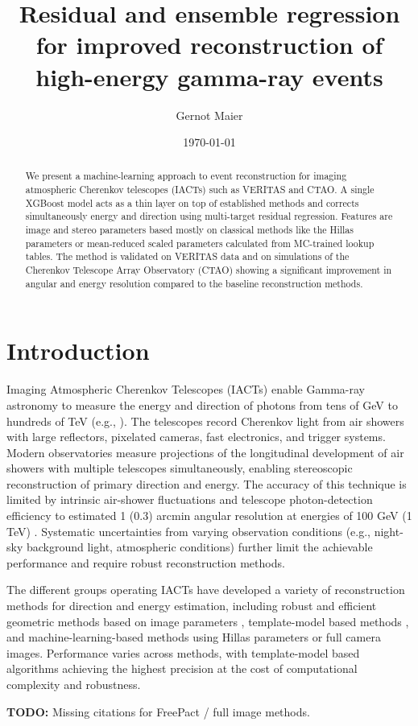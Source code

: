 \documentclass[12pt]{article}
\title{Residual and ensemble regression for improved reconstruction of high-energy gamma-ray events}
\author{Gernot Maier}
\date{\today}
\newcommand{\todo}[1]{\begin{hintBox} \textbf{TODO:} #1 \end{hintBox}}
\begin{document}
\maketitle

\begin{abstract}
We present a machine-learning approach to event reconstruction
for imaging atmospheric Cherenkov telescopes (IACTs) such as VERITAS and
CTAO.
A single XGBoost model acts as a thin layer on top of established methods and
corrects simultaneously energy and direction using multi-target residual regression.
Features are image and stereo parameters based mostly on classical methods like
the Hillas parameters or mean-reduced scaled parameters calculated from MC-trained
lookup tables.
The method is validated on VERITAS data and on simulations of the Cherenkov Telescope
Array Observatory (CTAO) showing a significant improvement in angular and energy
resolution compared to the baseline reconstruction methods.
\end{abstract}

\section{Introduction}

Imaging Atmospheric Cherenkov Telescopes (IACTs) enable Gamma-ray astronomy
to measure the energy and direction of photons from
 tens of GeV to hundreds of TeV (e.g., \citep{2009ARA&A..47..523H}).
The telescopes record Cherenkov light from air showers with
large reflectors, pixelated cameras, fast electronics, and trigger systems.
Modern observatories measure projections of the longitudinal development of air showers
with multiple telescopes simultaneously,
enabling stereoscopic reconstruction of primary direction and energy.
The accuracy of this technique is limited by intrinsic air-shower fluctuations and
telescope photon-detection efficiency to estimated
1 (0.3) arcmin angular resolution at energies of 100 GeV (1 TeV)
\citep{hofmann2006performancelimitscherenkovinstruments}.
Systematic uncertainties from varying observation conditions (e.g., night-sky background light,
atmospheric conditions) further limit the achievable performance and require robust
reconstruction methods.

The different groups operating IACTs have developed a variety of reconstruction methods for direction and energy estimation,
including robust and efficient geometric methods based on image parameters
\citep{1985ICRC....3..445H, 1997APh.....8....1D, 1999APh....12..135H},
template-model based methods \citep{2001A&A...374..895P,2006APh....25..195L, 2009APh....32..231D,2014APh....56...26P},
and machine-learning-based methods using
Hillas parameters \citep{2024A&A...691A.328A} or full camera images.
Performance varies across methods, with template-model based algorithms achieving
the highest precision at the cost of computational complexity and robustness.
\todo{Missing citations for FreePact / full image methods.}
\end{document}
